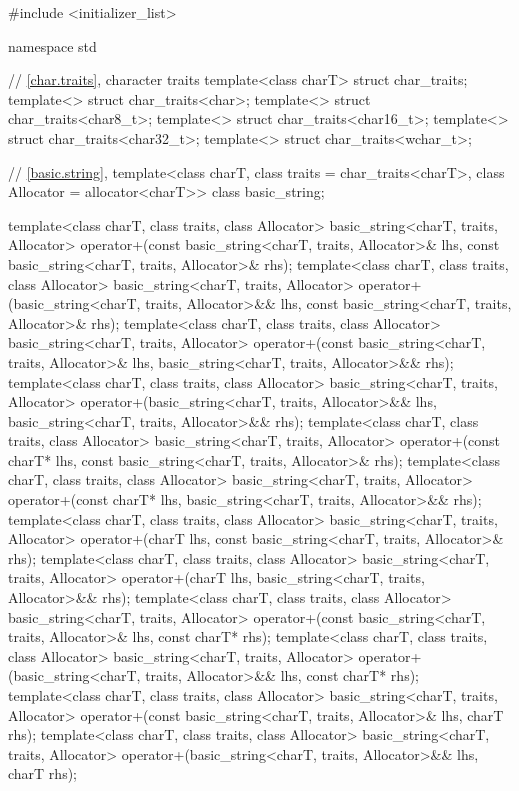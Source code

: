 \begin{codeblock}
#include <initializer_list>

namespace std {
  // \ref{char.traits}, character traits
  template<class charT> struct char_traits;
  template<> struct char_traits<char>;
  template<> struct char_traits<char8_t>;
  template<> struct char_traits<char16_t>;
  template<> struct char_traits<char32_t>;
  template<> struct char_traits<wchar_t>;

  // \ref{basic.string}, 
  template<class charT, class traits = char_traits<charT>, class Allocator = allocator<charT>>
    class basic_string;

  template<class charT, class traits, class Allocator>
    basic_string<charT, traits, Allocator>
      operator+(const basic_string<charT, traits, Allocator>& lhs,
                const basic_string<charT, traits, Allocator>& rhs);
  template<class charT, class traits, class Allocator>
    basic_string<charT, traits, Allocator>
      operator+(basic_string<charT, traits, Allocator>&& lhs,
                const basic_string<charT, traits, Allocator>& rhs);
  template<class charT, class traits, class Allocator>
    basic_string<charT, traits, Allocator>
      operator+(const basic_string<charT, traits, Allocator>& lhs,
                basic_string<charT, traits, Allocator>&& rhs);
  template<class charT, class traits, class Allocator>
    basic_string<charT, traits, Allocator>
      operator+(basic_string<charT, traits, Allocator>&& lhs,
                basic_string<charT, traits, Allocator>&& rhs);
  template<class charT, class traits, class Allocator>
    basic_string<charT, traits, Allocator>
      operator+(const charT* lhs,
                const basic_string<charT, traits, Allocator>& rhs);
  template<class charT, class traits, class Allocator>
    basic_string<charT, traits, Allocator>
      operator+(const charT* lhs,
                basic_string<charT, traits, Allocator>&& rhs);
  template<class charT, class traits, class Allocator>
    basic_string<charT, traits, Allocator>
      operator+(charT lhs,
                const basic_string<charT, traits, Allocator>& rhs);
  template<class charT, class traits, class Allocator>
    basic_string<charT, traits, Allocator>
      operator+(charT lhs,
                basic_string<charT, traits, Allocator>&& rhs);
  template<class charT, class traits, class Allocator>
    basic_string<charT, traits, Allocator>
      operator+(const basic_string<charT, traits, Allocator>& lhs,
                const charT* rhs);
  template<class charT, class traits, class Allocator>
    basic_string<charT, traits, Allocator>
      operator+(basic_string<charT, traits, Allocator>&& lhs,
                const charT* rhs);
  template<class charT, class traits, class Allocator>
    basic_string<charT, traits, Allocator>
      operator+(const basic_string<charT, traits, Allocator>& lhs,
                charT rhs);
  template<class charT, class traits, class Allocator>
    basic_string<charT, traits, Allocator>
      operator+(basic_string<charT, traits, Allocator>&& lhs,
                charT rhs);

}
\end{codeblock}
